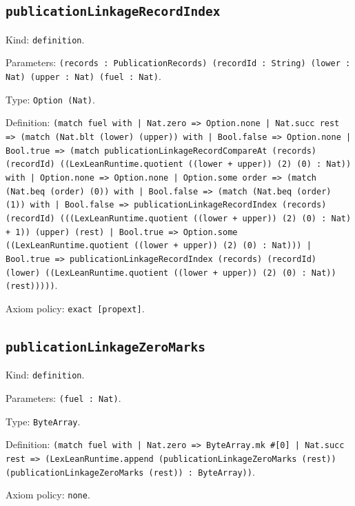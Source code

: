 \documentclass[11pt]{article}
\begin{document}
\subsection*{\texttt{publicationLinkageRecordIndex}}
\noindent Kind: \texttt{definition}.\par
\noindent Parameters: \texttt{(records : PublicationRecords) (recordId : String) (lower : Nat) (upper : Nat) (fuel : Nat)}.\par
\noindent Type: \texttt{Option (Nat)}.\par
\noindent Definition: \texttt{(match fuel with | Nat.zero => Option.none | Nat.succ rest => (match (Nat.blt (lower) (upper)) with | Bool.false => Option.none | Bool.true => (match publicationLinkageRecordCompareAt (records) (recordId) ((LexLeanRuntime.quotient ((lower + upper)) (2) (0) : Nat)) with | Option.none => Option.none | Option.some order => (match (Nat.beq (order) (0)) with | Bool.false => (match (Nat.beq (order) (1)) with | Bool.false => publicationLinkageRecordIndex (records) (recordId) (((LexLeanRuntime.quotient ((lower + upper)) (2) (0) : Nat) + 1)) (upper) (rest) | Bool.true => Option.some ((LexLeanRuntime.quotient ((lower + upper)) (2) (0) : Nat))) | Bool.true => publicationLinkageRecordIndex (records) (recordId) (lower) ((LexLeanRuntime.quotient ((lower + upper)) (2) (0) : Nat)) (rest)))))}.\par
\noindent Axiom policy: \texttt{exact [propext]}.\par
\subsection*{\texttt{publicationLinkageZeroMarks}}
\noindent Kind: \texttt{definition}.\par
\noindent Parameters: \texttt{(fuel : Nat)}.\par
\noindent Type: \texttt{ByteArray}.\par
\noindent Definition: \texttt{(match fuel with | Nat.zero => ByteArray.mk \#[0] | Nat.succ rest => (LexLeanRuntime.append (publicationLinkageZeroMarks (rest)) (publicationLinkageZeroMarks (rest)) : ByteArray))}.\par
\noindent Axiom policy: \texttt{none}.\par
\end{document}

